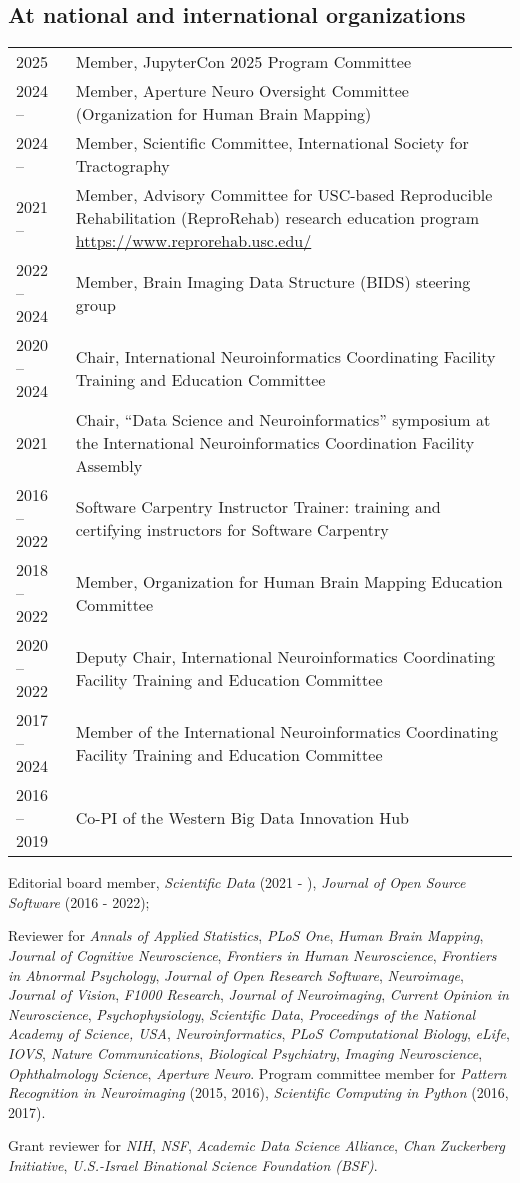 \documentclass[11pt,fullpage]{article}
\begin{document}
\subsection*{At national and international organizations}
\begin{tabular}{p{}p{}}
2025 & Member, JupyterCon 2025 Program Committee \\
2024 -- & Member, Aperture Neuro Oversight Committee (Organization for Human Brain Mapping)\\
2024 -- & Member, Scientific Committee, International Society for Tractography\\
2021 -- & Member, Advisory Committee for USC-based Reproducible Rehabilitation (ReproRehab) research education program \url{https://www.reprorehab.usc.edu/}\\
2022 -- 2024 & Member, Brain Imaging Data Structure (BIDS) steering group\\
2020 -- 2024 & Chair, International Neuroinformatics Coordinating Facility Training and Education Committee\\
2021 & Chair, ``Data Science and Neuroinformatics'' symposium at the International Neuroinformatics Coordination Facility Assembly\\
2016 -- 2022 & Software Carpentry Instructor Trainer: training and certifying instructors for Software Carpentry\\
2018 -- 2022 & Member, Organization for Human Brain Mapping Education Committee\\
2020 -- 2022 & Deputy Chair, International Neuroinformatics Coordinating Facility Training and Education Committee\\
2017 -- 2024 & Member of the International Neuroinformatics Coordinating Facility Training and Education Committee\\
2016 -- 2019 & Co-PI of the Western Big Data Innovation Hub\\
\end{tabular}

\bigskip
Editorial board member, \emph{Scientific Data} (2021 - ), \emph{Journal of Open Source Software} (2016 - 2022);

\vspace{4pt}

Reviewer for \emph{Annals of Applied Statistics}, \emph{PLoS One}, \emph{Human Brain Mapping}, \emph{Journal of Cognitive Neuroscience}, \emph{Frontiers in Human Neuroscience}, \emph{Frontiers in Abnormal Psychology}, \emph{Journal of Open Research Software}, \emph{Neuroimage}, \emph{Journal of Vision}, \emph{F1000 Research}, \emph{Journal of Neuroimaging}, \emph{Current Opinion in Neuroscience}, \emph{Psychophysiology}, \emph{Scientific Data}, \emph{Proceedings of the National Academy of Science, USA}, \emph{Neuroinformatics}, \emph{PLoS Computational Biology}, \emph{eLife}, \emph{IOVS}, \emph{Nature Communications}, \emph{Biological Psychiatry}, \emph{Imaging Neuroscience}, \emph{Ophthalmology Science}, \emph{Aperture Neuro}. Program committee member for \emph{Pattern Recognition in Neuroimaging} (2015, 2016), \emph{Scientific Computing in Python} (2016, 2017).

\vspace{4pt}

Grant reviewer for \emph{NIH}, \emph{NSF}, \emph{Academic Data Science Alliance}, \emph{Chan Zuckerberg Initiative}, \emph{U.S.-Israel Binational Science Foundation (BSF)}.


\end{document}
